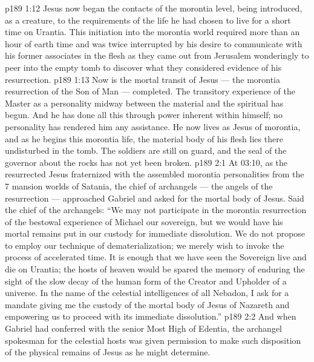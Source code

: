 \vs p189 1:12 Jesus now began the contacts of the morontia level, being introduced, as a creature, to the requirements of the life he had chosen to live for a short time on Urantia. This initiation into the morontia world required more than an hour of earth time and was twice interrupted by his desire to communicate with his former associates in the flesh as they came out from Jerusalem wonderingly to peer into the empty tomb to discover what they considered evidence of his resurrection.
\vs p189 1:13 Now is the mortal transit of Jesus --- the morontia resurrection of the Son of Man --- completed. The transitory experience of the Master as a personality midway between the material and the spiritual has begun. And he has done all this through power inherent within himself; no personality has rendered him any assistance. He now lives as Jesus of morontia, and as he begins this morontia life, the material body of his flesh lies there undisturbed in the tomb. The soldiers are still on guard, and the seal of the governor about the rocks has not yet been broken.
\vs p189 2:1 At 03:10, as the resurrected Jesus fraternized with the assembled morontia personalities from the 7 mansion worlds of Satania, the chief of archangels --- the angels of the resurrection --- approached Gabriel and asked for the mortal body of Jesus. Said the chief of the archangels: “We may not participate in the morontia resurrection of the bestowal experience of Michael our sovereign, but we would have his mortal remains put in our custody for immediate dissolution. We do not propose to employ our technique of dematerialization; we merely wish to invoke the process of accelerated time. It is enough that we have seen the Sovereign live and die on Urantia; the hosts of heaven would be spared the memory of enduring the sight of the slow decay of the human form of the Creator and Upholder of a universe. In the name of the celestial intelligences of all Nebadon, I ask for a mandate giving me the custody of the mortal body of Jesus of Nazareth and empowering us to proceed with its immediate dissolution.”
\vs p189 2:2 And when Gabriel had conferred with the senior Most High of Edentia, the archangel spokesman for the celestial hosts was given permission to make such disposition of the physical remains of Jesus as he might determine.
